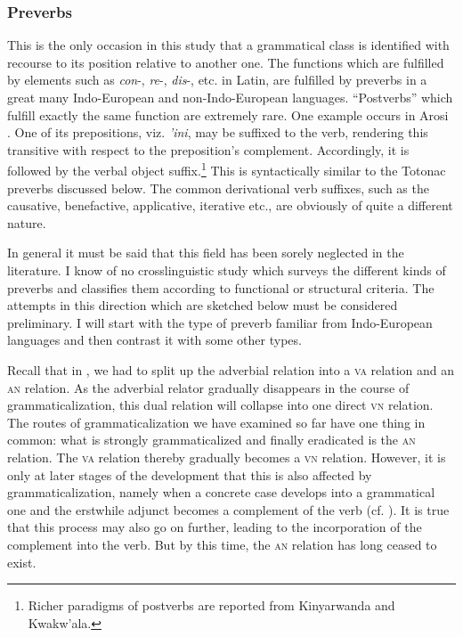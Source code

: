\subsubsection{Preverbs} \label{sec:3.4.1.6}
This is the only occasion in this study that a grammatical class is identified with recourse to its position relative to another one. The functions which are fulfilled by elements such as \textit{con}{}-, \textit{re}{}-, \textit{dis}{}-, etc. in Latin, are fulfilled by preverbs in a great many Indo-European and non-Indo-European languages. ``Postverbs'' which fulfill exactly the same function are extremely rare.\label{page105} One example occurs in Arosi \citep[30f]{Capell1971}. One of its prepositions, viz. \textit{'ini}, may be suffixed to the verb, rendering this transitive with respect to the preposition's complement. Accordingly, it is followed by the verbal object suffix.\footnote{Richer paradigms of postverbs are reported from Kinyarwanda and Kwakw'ala.} This is syntactically similar to the Totonac preverbs discussed below. The common derivational verb suffixes, such as the causative, benefactive, applicative, iterative etc., are obviously of quite a different nature.

In general it must be said that this field has been sorely neglected in the literature. I know of no crosslinguistic study which surveys the different kinds of preverbs and classifies them according to functional or structural criteria. The attempts in this direction which are sketched below must be considered preliminary. I will start with the type of preverb familiar from Indo-European languages and then contrast it with some other types.

Recall that in , we had to split up the adverbial relation into a \textsc{va} relation and an \textsc{an} relation. As the adverbial relator gradually disappears in the course of grammaticalization, this dual relation will collapse into one direct \textsc{vn} relation. The routes of grammaticalization we have examined so far have one thing in common: what is strongly grammaticalized and finally eradicated is the \textsc{an} relation. The \textsc{va} relation thereby gradually becomes a \textsc{vn} relation. However, it is only at later stages of the development that this is also affected by grammaticalization, namely when a concrete case develops into a grammatical one and the erstwhile adjunct becomes a complement of the verb (cf. ). It is true that this process may also go on further, leading to the incorporation of the complement into the verb. But by this time, the \textsc{an} relation has long ceased to exist.

